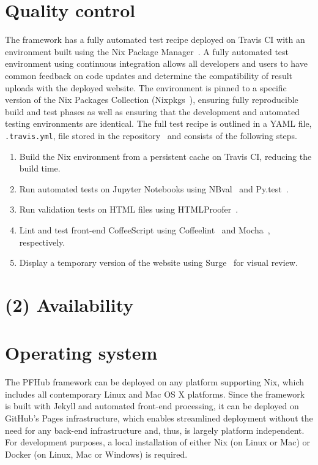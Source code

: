 \documentclass{jors}
\begin{document}
\section*{Quality control}

The framework has a fully automated test recipe deployed on Travis CI
with an environment built using the Nix Package Manager~\cite{nix}. A
fully automated test environment using continuous integration allows
all developers and users to have common feedback on code updates and
determine the compatibility of result uploads with the deployed
website. The environment is pinned to a specific version of the Nix
Packages Collection (Nixpkgs~\cite{nixpkgs}), ensuring fully
reproducible build and test phases as well as ensuring that the
development and automated testing environments are identical. The full
test recipe is outlined in a YAML file, \texttt{.travis.yml}, file
stored in the repository~\cite{travisyml} and consists of the
following steps.

\begin{enumerate}
  \item Build the Nix environment from a persistent cache on Travis
    CI, reducing the build time.
  \item Run automated tests on Jupyter Notebooks using
    NBval~\cite{nbval} and Py.test~\cite{pytest}.
  \item Run validation tests on HTML files using
    HTMLProofer~\cite{htmlproofer}.
  \item Lint and test front-end CoffeeScript using
    Coffeelint~\cite{coffeelint} and Mocha~\cite{mocha}, respectively.
  \item Display a temporary version of the website using
    Surge~\cite{surge} for visual review.
\end{enumerate}

\section*{(2) Availability}
\vspace{0.5cm}
\section*{Operating system}

The PFHub framework can be deployed on any platform supporting Nix,
which includes all contemporary Linux and Mac OS X platforms. Since
the framework is built with Jekyll and automated front-end processing,
it can be deployed on GitHub's Pages infrastructure, which enables
streamlined deployment without the need for any back-end
infrastructure and, thus, is largely platform independent. For
development purposes, a local installation of either Nix (on Linux or
Mac) or Docker (on Linux, Mac or Windows) is required.
\end{document}
